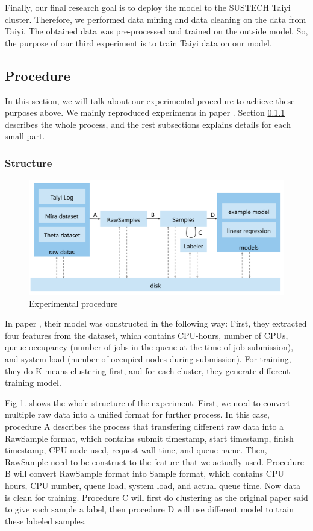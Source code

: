 \documentclass[conference,compsoc]{IEEEtran}
\begin{document}
Finally, our final research goal is to deploy the model to the SUSTECH Taiyi cluster. Therefore, we performed data mining and data cleaning on the data from Taiyi. The obtained data was pre-processed and trained on the outside model. So, the purpose of our third experiment is to train Taiyi data on our model.

\subsection{Procedure}
In this section, we will talk about our experimental procedure to achieve these purposes above. We mainly  reproduced experiments in paper \cite{pal2021integrated}.
Section \ref{structure} describes the whole process, and the rest subsections explains details for each small part.

\subsubsection{Structure}
\label{structure}
\begin{figure}[htbp]
	\centering
	\includegraphics[width=\linewidth,scale=1.00]{structure.png}
	\caption{Experimental procedure}
	\label{structure.png}
\end{figure}
In paper \cite{pal2021integrated}, their model was constructed in the following way: First, they extracted four features from the dataset, which contains CPU-hours, number of CPUs, queue occupancy (number of jobs in the queue at the time of job submission), and system load (number of occupied nodes during submission). For training, they do K-means clustering first, and for each cluster, they generate different training model.

Fig \ref{structure.png}. shows the whole structure of the experiment. First, we need to convert multiple raw data into a unified format for further process. In this case, procedure A describes the process that transfering different raw data into a RawSample format, which contains submit timestamp, start timestamp, finish timestamp, CPU node used, request wall time, and queue name. Then, RawSample need to be construct to the feature that we actually used. Procedure B will convert RawSample format into Sample format, which contains CPU hours, CPU number, queue load, system load, and actual queue time. Now data is clean for training. Procedure C will first do clustering as the original paper said to give each sample a label, then procedure D will use different model to train these labeled samples.
\end{document}
